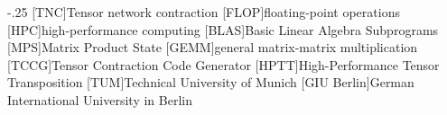 \documentclass[headsepline,footsepline,footinclude=false,oneside,fontsize=11pt,paper=a4,listof=totoc,bibliography=totoc]{scrbook} %
\begin{document}


\frontmatter{}





\tableofcontents{}

\mainmatter{}












\appendix{}





\begin{acronym}
	\itemsep-.25\baselineskip
	[TNC]{Tensor network contraction}
	[FLOP]{floating-point operations}
	[HPC]{high-performance computing}
	[BLAS]{Basic Linear Algebra Subprograms}
	[MPS]{Matrix Product State}
	[GEMM]{general matrix-matrix multiplication}
	[TCCG]{Tensor Contraction Code Generator}
	[HPTT]{High-Performance Tensor Transposition}
	[TUM]{Technical University of Munich}
	[GIU Berlin]{German International University in Berlin}
\end{acronym}

\listoffigures{}
\printbibliography{}
\end{document}
